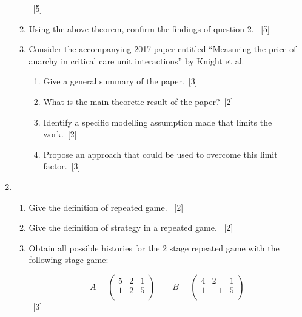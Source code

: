 \documentclass[12pt,a4paper]{article}
\begin{document}
\begin{enumerate}
\begin{enumerate}
              ~\hfill{[5]}

        \item Using the above theorem, confirm the findings of question 2.
              ~\hfill{[5]}

        \item Consider the accompanying 2017 paper entitled ``Measuring the price
            of anarchy in critical care unit interactions'' by Knight et al.

            \begin{enumerate}
                \item Give a general summary of the paper.~\hfill{[3]}
                \item What is the main theoretic result of the
                    paper?~\hfill{[2]}
                \item Identify a specific modelling assumption made that limits
                    the work.~\hfill{[2]}
                \item Propose an approach that could be used to overcome
                    this limit factor.~\hfill{[3]}
            \end{enumerate}
    \end{enumerate}

\newpage
\item

    \begin{enumerate}
        \item Give the definition of repeated game.
            ~\hfill{[2]}
        \item Give the definition of strategy in a repeated game.
            ~\hfill{[2]}
        \item Obtain all possible histories for the 2 stage repeated game with
            the following stage game:

            \[
                A = \begin{pmatrix}
                    5 & 2 & 1\\
                    1 & 2 & 5\\
                    \end{pmatrix}
                \qquad
                B = \begin{pmatrix}
                    4 & 2  & 1\\
                    1 & -1 & 5\\
                    \end{pmatrix}
            \]
            ~\hfill{[3]}


\end{enumerate}
\end{enumerate}
\end{document}
